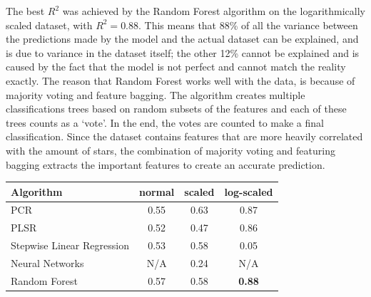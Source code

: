         
        The best $R^2$ was achieved by the Random Forest algorithm on the logarithmically scaled dataset, with $R^2 = 0.88$. This means that 88\% of all the variance between the predictions made by the model and the actual dataset can be explained, and is due to variance in the dataset itself; the other 12\% cannot be explained and is caused by the fact that the model is not perfect and cannot match the reality exactly.
        The reason that Random Forest \cite{breiman-2001} works well with the data, is because of majority voting and feature bagging.
        The algorithm creates multiple classifications trees based on random subsets of the features and each of these trees counts as a `vote'.
        In the end, the votes are counted to make a final classification.
        Since the dataset contains features that are more heavily correlated with the amount of stars, the combination of majority voting and featuring bagging extracts the important features to create an accurate prediction.
                
                \begin{center}
        \begin{tabular}[width=250pt]{|l|c|c|c|}

            \hline
            Algorithm                   & normal    & scaled   & log-scaled \\ \hline
            PCR       \footnotemark[1]                  &   0.55    & 0.63     & 0.87          \\
            PLSR      \footnotemark[1]           &   0.52    & 0.47     & 0.86          \\
            Stepwise Linear Regression\footnotemark[3]  &   0.53    & 0.58     & 0.05         \\
            Neural Networks\footnotemark[4]             &   N/A     &   0.24   & N/A               \\
            Random Forest\footnotemark[5]\footnotemark[6]  &   0.57    & 0.58     & \textbf{0.88} \\
            \hline
        \end{tabular}
        \label{table:r-squared-table}
        \end{center}
                
